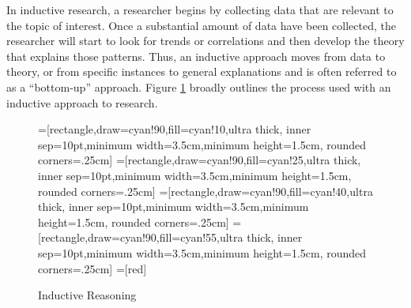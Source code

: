 In inductive research, a researcher begins by collecting data that are relevant to the topic of interest. Once a substantial amount of data have been collected, the researcher will start to look for trends or correlations and then develop the theory that explains those patterns. Thus, an inductive approach moves from data to theory, or from specific instances to general explanations and is often referred to as a ``bottom-up'' approach. Figure \ref{02.fig02} broadly outlines the process used with an inductive approach to research.

\begin{center}
	\begin{figure}[H]
		=[rectangle,draw=cyan!90,fill=cyan!10,ultra thick,
		inner sep=10pt,minimum width=3.5cm,minimum height=1.5cm,
		rounded corners=.25cm]
		=[rectangle,draw=cyan!90,fill=cyan!25,ultra thick,
		inner sep=10pt,minimum width=3.5cm,minimum height=1.5cm,
		rounded corners=.25cm]
		=[rectangle,draw=cyan!90,fill=cyan!40,ultra thick,
		inner sep=10pt,minimum width=3.5cm,minimum height=1.5cm,
		rounded corners=.25cm]
		=[rectangle,draw=cyan!90,fill=cyan!55,ultra thick,
		inner sep=10pt,minimum width=3.5cm,minimum height=1.5cm,
		rounded corners=.25cm]			
		=[red]
		\caption{Inductive Reasoning}
		\label{02.fig02}
	\end{figure}
\end{center}

